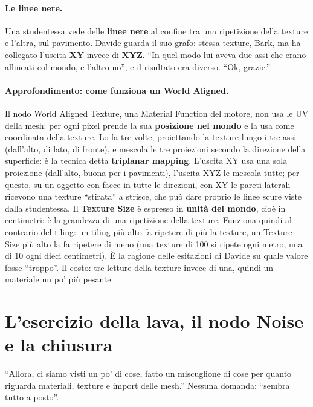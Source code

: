 \paragraph{Le linee nere.} Una studentessa vede delle \textbf{linee nere} al confine tra
una ripetizione della texture e l'altra, sul pavimento. Davide guarda il suo grafo:
stessa texture, Bark, ma ha collegato l'uscita \textbf{XY} invece di \textbf{XYZ}. ``In
quel modo lui aveva due assi che erano allineati col mondo, e l'altro no'', e il
risultato era diverso. ``Ok, grazie.''

\paragraph{Approfondimento: come funziona un World Aligned.} Il nodo World Aligned
Texture, una Material Function del motore, non usa le UV della mesh: per ogni pixel
prende la sua \textbf{posizione nel mondo} e la usa come coordinata della texture. Lo fa
tre volte, proiettando la texture lungo i tre assi (dall'alto, di lato, di fronte), e
mescola le tre proiezioni secondo la direzione della superficie: è la tecnica detta
\textbf{triplanar mapping}. L'uscita XY usa una sola proiezione (dall'alto, buona per i
pavimenti), l'uscita XYZ le mescola tutte; per questo, su un oggetto con facce in tutte
le direzioni, con XY le pareti laterali ricevono una texture ``stirata'' a strisce, che
può dare proprio le linee scure viste dalla studentessa. Il \textbf{Texture Size} è
espresso in \textbf{unità del mondo}, cioè in centimetri: è la grandezza di una
ripetizione della texture. Funziona quindi al contrario del tiling: un tiling più alto
fa ripetere di più la texture, un Texture Size più alto la fa ripetere di meno (una
texture di 100 si ripete ogni metro, una di 10 ogni dieci centimetri). È la ragione
delle esitazioni di Davide su quale valore fosse ``troppo''. Il costo: tre letture della
texture invece di una, quindi un materiale un po' più pesante.

\section{L'esercizio della lava, il nodo Noise e la chiusura}
\label{ue3:sec:lava}

``Allora, ci siamo visti un po' di cose, fatto un miscuglione di cose per quanto riguarda
materiali, texture e import delle mesh.'' Nessuna domanda: ``sembra tutto a posto''.

